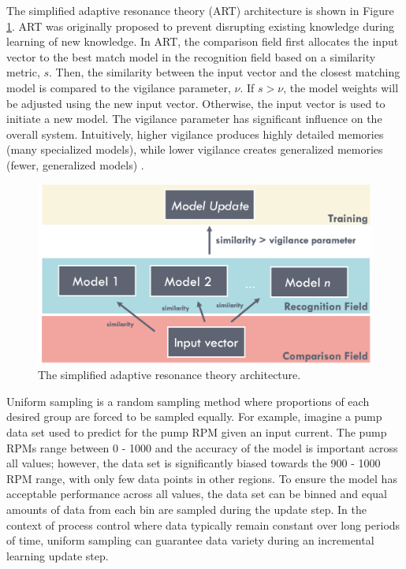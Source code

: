 The simplified adaptive resonance theory (ART) architecture is shown in Figure \ref{fig:02art}. ART was originally proposed to prevent disrupting existing knowledge during learning of new knowledge.  In ART, the comparison field first allocates the input vector to the best match model in the recognition field based on a similarity metric, $s$.  Then, the similarity between the input vector and the closest matching model is compared to the vigilance parameter, $\nu$.  If $s > \nu$, the model weights will be adjusted using the new input vector.  Otherwise, the input vector is used to initiate a new model.  The vigilance parameter has significant influence on the overall system.  Intuitively, higher vigilance produces highly detailed memories (many specialized models), while lower vigilance creates generalized memories (fewer, generalized models) \cite{art}.

\begin{figure}[h]
    \centering
    \includegraphics[width=\textwidth]{images/ch2/02art.jpeg}
    \caption{The simplified adaptive resonance theory architecture.}
    \label{fig:02art}
\end{figure}

Uniform sampling is a random sampling method where proportions of each desired group are forced to be sampled equally. For example, imagine a pump data set used to predict for the pump RPM given an input current.  The pump RPMs range between 0 - 1000 and the accuracy of the model is important across all values; however, the data set is significantly biased towards the 900 - 1000 RPM range, with only few data points in other regions. To ensure the model has acceptable performance across all values, the data set can be binned and equal amounts of data from each bin are sampled during the update step.  In the context of process control where data typically remain constant over long periods of time, uniform sampling can guarantee data variety during an incremental learning update step.

